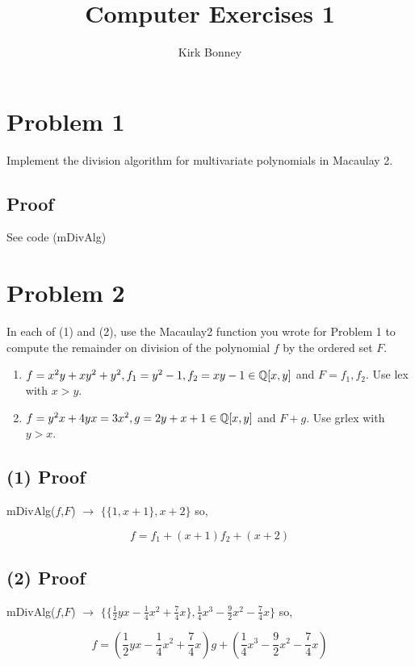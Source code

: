 \documentclass{article}
\title{Computer Exercises 1}
\author{Kirk Bonney}
\date{}
\begin{document}
\maketitle

\section*{Problem 1}

Implement the division algorithm for multivariate polynomials in Macaulay 2.

\subsection*{Proof}

See code (mDivAlg)

\section*{Problem 2}
In each of (1) and (2), use the Macaulay2 function you wrote for Problem 1 to compute the remainder on division of the polynomial $f$ by the ordered set $F$.
\begin{enumerate}[label = (\arabic*)]
\item $f = x^2y + xy^2 +y^2, f_1 = y^2 - 1, f_2 = xy -1 \in \mathbb Q[x,y]$ and $F = {f_1, f_2}$. Use lex with $x>y$.
\item $f = y^2x +4yx =3x^2, g = 2y + x + 1 \in \mathbb Q[x,y]$ and $F + {g}$. Use grlex with $y > x$.
\end{enumerate}

\subsection*{(1) Proof}

mDivAlg($f$,$F$) $\rightarrow$ $\{ \{ 1, x + 1 \}, x+2 \}$ so,

$$
f = f_1 + (x+1)f_2 + (x + 2)
$$

\subsection*{(2) Proof}

mDivAlg($f$,$F$) $\rightarrow$ $ \{ \{ \frac{1}{2} yx - \frac{1}{4} x^2 + \frac{7}{4} x \}, \frac{1}{4} x^3 - \frac{9}{2} x^2 - \frac{7}{4} x \}$ so,

$$
f = (\frac{1}{2} yx - \frac{1}{4} x^2 + \frac{7}{4} x) g + (\frac{1}{4} x^3 - \frac{9}{2} x^2 - \frac{7}{4} x)
$$
\end{document}
